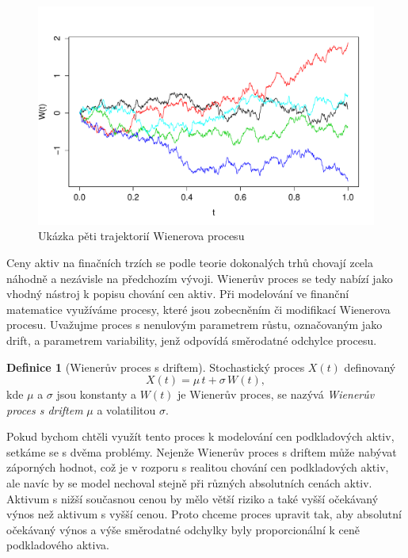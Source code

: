 \documentclass[a4paper,12pt]{report}
\theoremstyle{definition} \newtheorem{definice}[veta]{Definice}
\theoremstyle{remark}
\begin{document}
\begin{figure}[!htbp]
  \centering 
	\includegraphics[width=13.5cm, clip, trim= 0 15 25 40]{IMG/WP_v2.pdf}
  \caption{Ukázka pěti trajektorií Wienerova procesu}  \label{WP_graf}
\end{figure}

Ceny aktiv na finačních trzích se podle teorie dokonalých trhů chovají zcela náhodně a nezávisle na předchozím vývoji.
Wienerův proces se tedy nabízí jako vhodný nástroj k popisu chování cen aktiv.
Při modelování ve finanční matematice využíváme procesy, které jsou zobecněním či modifikací Wienerova procesu. 
Uvažujme proces s nenulovým parametrem růstu, označovaným jako drift, a parametrem variability, jenž odpovídá směrodatné odchylce procesu.
\begin{definice}[Wienerův proces s driftem]
Stochastický proces $X(t)$ definovaný 
$$X(t)  = \mu\, t + \sigma\, W (t),$$
kde $\mu$ a $\sigma$ jsou konstanty a $W (t)$ je Wienerův proces,
se nazývá \textit{Wienerův proces  s driftem} $\mu$ a volatilitou $\sigma$.
\end{definice}
Pokud bychom chtěli využít tento proces k modelování cen podkladových aktiv, setkáme se s dvěma problémy.
Nejenže Wienerův proces s driftem může nabývat záporných hodnot, což je v rozporu s realitou chování cen podkladových aktiv, ale navíc by se model nechoval stejně při různých absolutních cenách aktiv. 
Aktivum s nižší současnou cenou by mělo větší riziko a také vyšší očekávaný výnos než aktivum s vyšší cenou.
Proto chceme proces upravit tak, aby absolutní očekávaný výnos a výše směrodatné odchylky byly proporcionální k ceně podkladového aktiva. 
\end{document}
